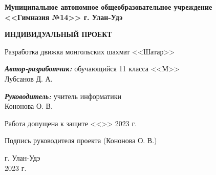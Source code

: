 \begin{titlepage}
	\begin{center}
		\textbf{ 
			Муниципальное автономное общеобразовательное учреждение \\
			<<Гимназия №14>> г. Улан-Удэ
		}
		
		\vspace{4em}
		\textbf{
			ИНДИВИДУАЛЬНЫЙ ПРОЕКТ
		}
		\vspace{4em}

		Разработка движка монгольских шахмат <<Шатар>>

		
	\end{center}
	\vspace{4em}
	\begin{flushright}
		
		\textbf{\textit{Автор-разработчик:}}
		обучающийся 11 класса <<М>> \\
		Лубсанов Д. А.
		
		\vspace{2em}
		
		\textbf{\textit{Руководитель:}}
		учитель информатики \\
		Кононова О. В.
		
	\end{flushright}
	
	\vspace{4em}
	
	Работа допущена к защите <<\underline{\hspace{2em}}>> \underline{\hspace{6em}} 2023 г.
	
	\vspace{1em}
	
	Подпись руководителя проекта \hspace{1em} \hrulefill \hspace{1em}(Кононова О. В.)
	
	\vspace{9em}
	
	\begin{center}
		г. Улан-Удэ \\
		2023 г.
	\end{center}
	
	\clearpage
\end{titlepage}